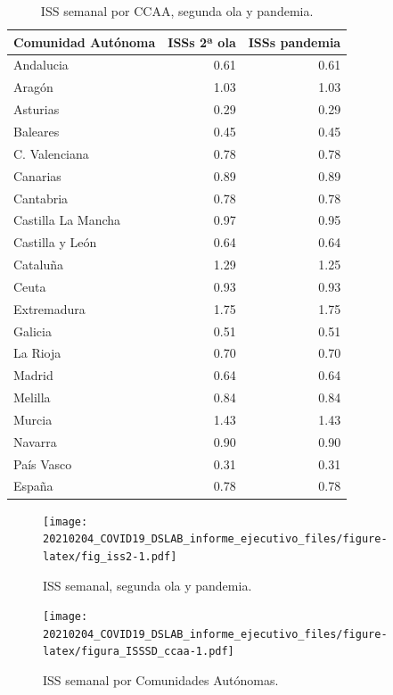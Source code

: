 \documentclass[
  11pt,
]{article}
\begin{document}
\begin{table}[!h]

\caption{\label{tab:tabla2}ISS semanal por CCAA, segunda ola y pandemia.}
\centering
\fontsize{9}{11}\selectfont
\begin{tabular}[t]{l|r|r}
\hline
Comunidad Autónoma & ISSs 2ª ola & ISSs pandemia\\
\hline
Andalucia & 0.61 & 0.61\\
\hline
Aragón & 1.03 & 1.03\\
\hline
Asturias & 0.29 & 0.29\\
\hline
Baleares & 0.45 & 0.45\\
\hline
C. Valenciana & 0.78 & 0.78\\
\hline
Canarias & 0.89 & 0.89\\
\hline
Cantabria & 0.78 & 0.78\\
\hline
Castilla La Mancha & 0.97 & 0.95\\
\hline
Castilla y León & 0.64 & 0.64\\
\hline
Cataluña & 1.29 & 1.25\\
\hline
Ceuta & 0.93 & 0.93\\
\hline
Extremadura & 1.75 & 1.75\\
\hline
Galicia & 0.51 & 0.51\\
\hline
La Rioja & 0.70 & 0.70\\
\hline
Madrid & 0.64 & 0.64\\
\hline
Melilla & 0.84 & 0.84\\
\hline
Murcia & 1.43 & 1.43\\
\hline
Navarra & 0.90 & 0.90\\
\hline
País Vasco & 0.31 & 0.31\\
\hline
España & 0.78 & 0.78\\
\hline
\end{tabular}
\end{table}

\begin{figure}
\centering
\texttt{[image: 20210204\_COVID19\_DSLAB\_informe\_ejecutivo\_files/figure-latex/fig\_iss2-1.pdf]}
\caption{\label{fig:fig_iss2} ISS semanal, segunda ola y pandemia.}
\end{figure}

\begin{figure}
\centering
\texttt{[image: 20210204\_COVID19\_DSLAB\_informe\_ejecutivo\_files/figure-latex/figura\_ISSSD\_ccaa-1.pdf]}
\caption{\label{fig:figura_ISSSD_ccaa} ISS semanal por Comunidades
Autónomas.}
\end{figure}
\end{document}
